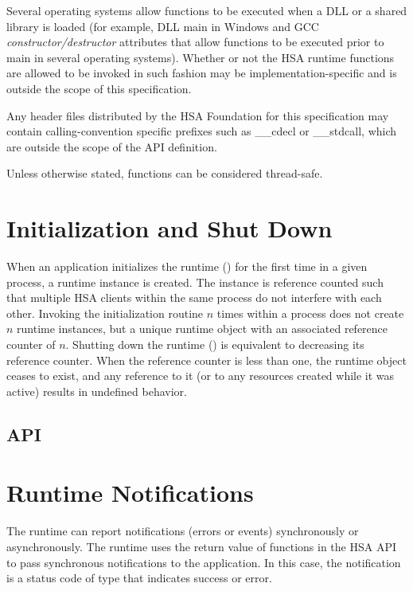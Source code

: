 \documentclass[final,oneside]{book}
\begin{document}
Several operating systems allow functions to be executed when a DLL or a shared
library is loaded (for example, DLL main in Windows and GCC
\emph{constructor/destructor} attributes that allow functions to be executed
prior to main in several operating systems). Whether or not the HSA runtime
functions are allowed to be invoked in such fashion may be
implementation-specific and is outside the scope of this specification.

Any header files distributed by the HSA Foundation for this specification may
contain calling-convention specific prefixes such as __cdecl or __stdcall, which
are outside the scope of the API definition.

Unless otherwise stated, functions can be considered thread-safe.

\section{Initialization and Shut Down}\label{sec:init}
When an application initializes the runtime () for the first
time in a given process, a runtime instance is created. The instance is
reference counted such that multiple HSA clients within the same
process do not interfere with each other. Invoking the initialization routine
$n$ times within a process does not create $n$ runtime instances, but a unique
runtime object with an associated reference counter of $n$. Shutting down the
runtime () is equivalent to decreasing its reference
counter. When the reference counter is less than one, the runtime object ceases
to exist, and any reference to it (or to any resources created while it was
active) results in undefined behavior.

\subsection{API}


\section{Runtime Notifications}
\label{sec:error}

The runtime can report notifications (errors or events) synchronously or
asynchronously. The runtime uses the return value of functions in the HSA API to
pass synchronous notifications to the application. In this case, the
notification is a status code of type  that indicates
success or error.
\end{document}
